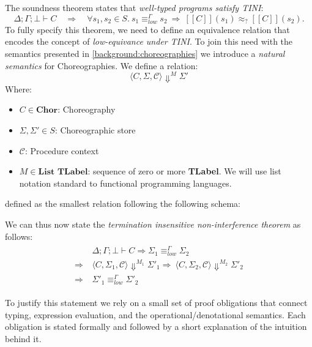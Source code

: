 \documentclass[12pt,a4paper,twoside]{book}
\newcommand{\llbracket}{[\![}
\newcommand{\rrbracket}{]\!]}
\begin{document}
The soundness theorem states that \emph{well-typed programs satisfy TINI}:
\[
  \Delta;\Gamma;\bot \vdash C
  \quad\Longrightarrow\quad
  \forall s_1,s_2 \in S.\ s_1 \equiv^\Gamma_{low} s_2 \ \Rightarrow\ \llbracket C \rrbracket(s_1) \approx_? \llbracket C \rrbracket(s_2).
\]
To fully specify this theorem, we need to define an equivalence relation that encodes the concept of \emph{low-equivance under TINI}.
To join this need with the semantics presented in \ref{background:choreographies} we introduce a \emph{natural semantics}\cite{kahn1987natural} for Choreographies. We define a relation:
$$
\langle C, \Sigma, \mathscr{C} \rangle \Downarrow^M \Sigma'
$$
Where:
\begin{itemize}
	\item $C \in \textbf{Chor}$: Choreography
	\item $\Sigma, \Sigma' \in S$: Choreographic store
	\item $\mathscr{C}$: Procedure context
	\item $M \in \textbf{List TLabel}$: sequence of zero or more \textbf{TLabel}. We will use list notation standard to functional programming languages.
\end{itemize}
defined as the smallest relation following the following schema:

We can thus now state the \emph{termination insensitive non-interference theorem} as follows:
\begin{align} \label{main:def}
\begin{split}
	&\Delta;\Gamma;\bot \vdash C \Rightarrow
	\Sigma_1 \equiv^\Gamma_{low} \Sigma_2 \\ \Rightarrow\ &\langle C, \Sigma_1, \mathscr{C}\rangle \Downarrow^{M_1} \Sigma'_1
	\Rightarrow\ \langle C, \Sigma_2, \mathscr{C}\rangle \Downarrow^{M_2} \Sigma'_2 \\ \Rightarrow\ &\Sigma'_1 \equiv^\Gamma_{low} \Sigma'_2
\end{split}
\end{align}

\medskip

\noindent
To justify this statement we rely on a small set of proof obligations that connect typing, expression evaluation, and the operational/denotational semantics. Each obligation is stated formally and followed by a short explanation of the intuition behind it.
\end{document}
